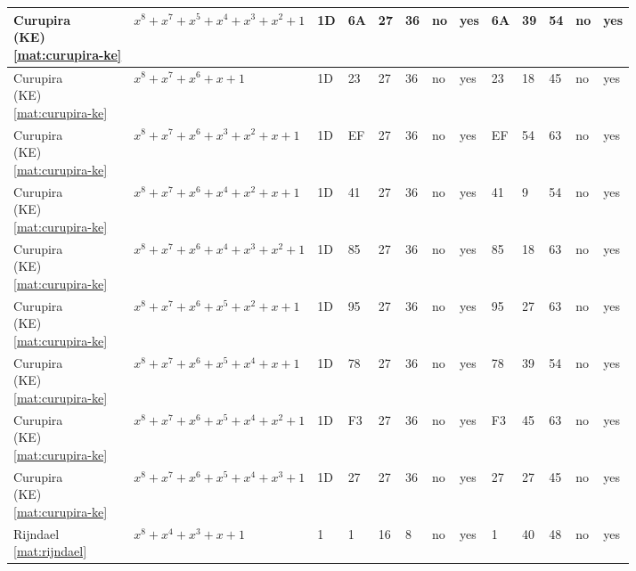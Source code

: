 \begin{tiny}
\begin{longtable}{|l|l|l|l|l|l|l|l|l|l|l|l|l|}
\shortstack{Curupira \\ (KE) \\ \eqref{mat:curupira-ke}} & $x^8 + x^7 + x^5 + x^4 + x^3 + x^2 + 1$ & 1D & 6A & 27 & 36 & no & yes & 6A & 39 & 54 & no & yes \\ \hline
\shortstack{Curupira \\ (KE) \\ \eqref{mat:curupira-ke}} & $x^8 + x^7 + x^6 + x + 1$ & 1D & 23 & 27 & 36 & no & yes & 23 & 18 & 45 & no & yes \\ \hline
\shortstack{Curupira \\ (KE) \\ \eqref{mat:curupira-ke}} & $x^8 + x^7 + x^6 + x^3 + x^2 + x + 1$ & 1D & EF & 27 & 36 & no & yes & EF & 54 & 63 & no & yes \\ \hline
\shortstack{Curupira \\ (KE) \\ \eqref{mat:curupira-ke}} & $x^8 + x^7 + x^6 + x^4 + x^2 + x + 1$ & 1D & 41 & 27 & 36 & no & yes & 41 & 9 & 54 & no & yes \\ \hline
\shortstack{Curupira \\ (KE) \\ \eqref{mat:curupira-ke}} & $x^8 + x^7 + x^6 + x^4 + x^3 + x^2 + 1$ & 1D & 85 & 27 & 36 & no & yes & 85 & 18 & 63 & no & yes \\ \hline
\shortstack{Curupira \\ (KE) \\ \eqref{mat:curupira-ke}} & $x^8 + x^7 + x^6 + x^5 + x^2 + x + 1$ & 1D & 95 & 27 & 36 & no & yes & 95 & 27 & 63 & no & yes \\ \hline
\shortstack{Curupira \\ (KE) \\ \eqref{mat:curupira-ke}} & $x^8 + x^7 + x^6 + x^5 + x^4 + x + 1$ & 1D & 78 & 27 & 36 & no & yes & 78 & 39 & 54 & no & yes \\ \hline
\shortstack{Curupira \\ (KE) \\ \eqref{mat:curupira-ke}} & $x^8 + x^7 + x^6 + x^5 + x^4 + x^2 + 1$ & 1D & F3 & 27 & 36 & no & yes & F3 & 45 & 63 & no & yes \\ \hline
\shortstack{Curupira \\ (KE) \\ \eqref{mat:curupira-ke}} & $x^8 + x^7 + x^6 + x^5 + x^4 + x^3 + 1$ & 1D & 27 & 27 & 36 & no & yes & 27 & 27 & 45 & no & yes \\ \hline
\shortstack{Rijndael \\ \eqref{mat:rijndael}} & $x^8 + x^4 + x^3 + x + 1$ & 1 & 1 & 16 & 8 & no & yes & 1 & 40 & 48 & no & yes \\ \hline

\end{longtable}
\end{tiny}
